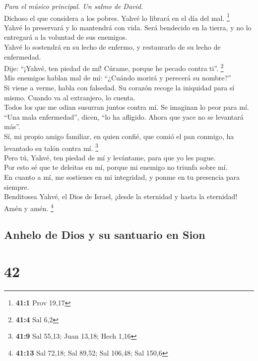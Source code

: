 \emph{Para el músico principal. Un salmo de David.}\\
 Dichoso el que considera a los pobres. Yahvé lo librará
en el día del mal. \footnote{\textbf{41:1} Prov 19,17}\\
 Yahvé lo preservará y lo mantendrá con vida. Será
bendecido en la tierra, y no lo entregará a la voluntad de sus
enemigos.\\
 Yahvé lo sostendrá en su lecho de enfermo, y restaurarlo
de su lecho de enfermedad.\\
 Dije: ``¡Yahvé, ten piedad de mí! Cúrame, porque he
pecado contra ti''. \footnote{\textbf{41:4} Sal 6,2}\\
 Mis enemigos hablan mal de mí: ``¿Cuándo morirá y
perecerá su nombre?''\\
 Si viene a verme, habla con falsedad. Su corazón recoge
la iniquidad para sí mismo. Cuando va al extranjero, lo cuenta.\\
 Todos los que me odian susurran juntos contra mí. Se
imaginan lo peor para mí.\\
 ``Una mala enfermedad'', dicen, ``lo ha afligido. Ahora
que yace no se levantará más''.\\
 Sí, mi propio amigo familiar, en quien confié, que comió
el pan conmigo, ha levantado su talón contra mí. \footnote{\textbf{41:9}
  Sal 55,13; Juan 13,18; Hech 1,16}\\
 Pero tú, Yahvé, ten piedad de mí y levántame, para que
yo les pague.\\
 Por esto sé que te deleitas en mí, porque mi enemigo no
triunfa sobre mí.\\
 En cuanto a mí, me sostienes en mi integridad, y ponme
en tu presencia para siempre.\\
 Benditosea Yahvé, el Dios de Israel, ¡desde la eternidad
y hasta la eternidad! Amén y amén. \footnote{\textbf{41:13} Sal 72,18;
  Sal 89,52; Sal 106,48; Sal 150,6}

\hypertarget{anhelo-de-dios-y-su-santuario-en-sion}{%
\subsection{Anhelo de Dios y su santuario en
Sion}\label{anhelo-de-dios-y-su-santuario-en-sion}}

\hypertarget{section-40}{%
\section{42}\label{section-40}}


